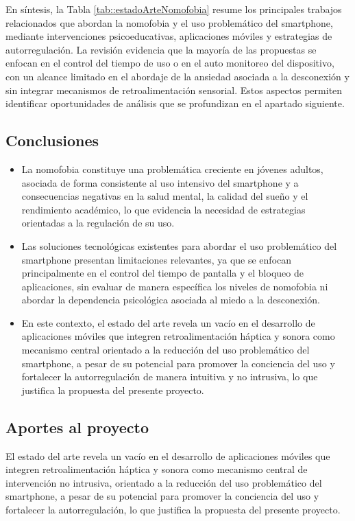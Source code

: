 

En síntesis, la Tabla \ref{tab::estadoArteNomofobia} resume los principales trabajos relacionados que abordan la nomofobia y el uso problemático del smartphone, mediante intervenciones psicoeducativas, aplicaciones móviles y estrategias de autorregulación. La revisión evidencia que la mayoría de las propuestas se enfocan en el control del tiempo de uso o en el auto monitoreo del dispositivo, con un alcance limitado en el abordaje de la ansiedad asociada a la desconexión y sin integrar mecanismos de retroalimentación sensorial. Estos aspectos permiten identificar oportunidades de análisis que se profundizan en el apartado siguiente.

\subsection{Conclusiones}

\begin{itemize}
    \item La nomofobia constituye una problemática creciente en jóvenes adultos, asociada de forma consistente al uso intensivo del smartphone y a consecuencias negativas en la salud mental, la calidad del sueño y el rendimiento académico, lo que evidencia la necesidad de estrategias orientadas a la regulación de su uso.
    \item Las soluciones tecnológicas existentes para abordar el uso problemático del smartphone presentan limitaciones relevantes, ya que se enfocan principalmente en el control del tiempo de pantalla y el bloqueo de aplicaciones, sin evaluar de manera específica los niveles de nomofobia ni abordar la dependencia psicológica asociada al miedo a la desconexión.
    \item En este contexto, el estado del arte revela un vacío en el desarrollo de aplicaciones móviles que integren retroalimentación háptica y sonora como mecanismo central orientado a la reducción del uso problemático del smartphone, a pesar de su potencial para promover la conciencia del uso y fortalecer la autorregulación de manera intuitiva y no intrusiva, lo que justifica la propuesta del presente proyecto.
\end{itemize}

\subsection{Aportes al proyecto}

El estado del arte revela un vacío en el desarrollo de aplicaciones móviles que integren retroalimentación háptica y sonora como mecanismo central de intervención no intrusiva, orientado a la reducción del uso problemático del smartphone, a pesar de su potencial para promover la conciencia del uso y fortalecer la autorregulación, lo que justifica la propuesta del presente proyecto.

